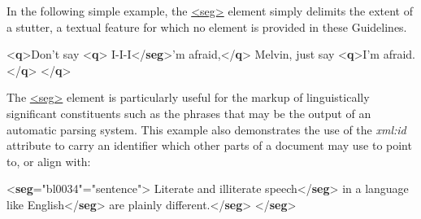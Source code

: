 In the following simple example, the \hyperref[TEI.seg]{<seg>} element simply delimits the extent of a stutter, a textual feature for which no element is provided in these Guidelines. \par\bgroup{}\exampleFont \begin{shaded}\noindent\mbox{}{<\textbf{q}>}Don't say {<\textbf{q}>}\mbox{}\newline 
\hspace*{1em}I-I-I{</\textbf{seg}>}'m afraid,{</\textbf{q}>} Melvin, just say {<\textbf{q}>}I'm\mbox{}\newline 
\hspace*{1em}\hspace*{1em} afraid.{</\textbf{q}>}\mbox{}\newline 
{</\textbf{q}>}\end{shaded}\egroup\par \noindent   The \hyperref[TEI.seg]{<seg>} element is particularly useful for the markup of linguistically significant constituents such as the phrases that may be the output of an automatic parsing system. This example also demonstrates the use of the {\itshape xml:id} attribute to carry an identifier which other parts of a document may use to point to, or align with: \par\bgroup{}\exampleFont \begin{shaded}\noindent\mbox{}{<\textbf{seg}\hspace*{1em}{xml:id}="{bl0034}"\hspace*{1em}{type}="{sentence}">}\mbox{}\newline 
{}Literate and illiterate speech{</\textbf{seg}>}\mbox{}\newline 
{}in a language like English{</\textbf{seg}>}\mbox{}\newline 
{}are plainly different.{</\textbf{seg}>}\mbox{}\newline 
{</\textbf{seg}>}\end{shaded}\egroup\par \noindent  \par

